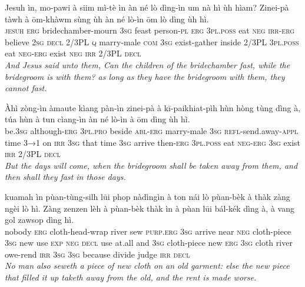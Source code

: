 \documentclass[11pt,a4paper]{article}
\begin{document}
\begin{exe}
\gll Jesuh ìn, mo-pawi à siim mì-tè ìn àn né lò dìng-ìn um nà hì ùh hìam? Zinei-pà tàwh à ōm-khàwm sùng ùh àn né lò-ìn ōm lò dìng ùh hì. \\
     \textsc{jesuh} \textsc{erg} bridechamber-mourn \textsc{3sg} feast person-\textsc{pl} \textsc{erg} \textsc{3pl}.\textsc{poss} eat \textsc{neg} \textsc{irr}-\textsc{erg} believe \textsc{2sg} \textsc{decl} 2/3PL \textsc{q} marry-male \textsc{com} \textsc{3sg} exist-gather inside 2/3PL \textsc{3pl}.\textsc{poss} eat \textsc{neg}-\textsc{erg} exist \textsc{neg} \textsc{irr} 2/3PL \textsc{decl} \\
\glt \textcolor{kjvcolor}{\textit{And Jesus said unto them, Can the children of the bridechamber fast, while the bridegroom is with them? as long as they have the bridegroom with them, they cannot fast.}}

\gll Àhì zòng-ìn àmaute kìang pàn-ìn zinei-pà à kī-paikhiat-pìh hùn hòng tùng dìng à, túa hùn à tun cìang-ìn àn né lò-ìn à ōm dìng ùh hì. \\
     be.\textsc{3sg} although-\textsc{erg} \textsc{3pl}.\textsc{pro} beside \textsc{abl}-\textsc{erg} marry-male \textsc{3sg} \textsc{refl}-send.away-\textsc{appl} time \textsc{3→1} on \textsc{irr} \textsc{3sg} that time \textsc{3sg} arrive then-\textsc{erg} \textsc{3pl}.\textsc{poss} eat \textsc{neg}-\textsc{erg} \textsc{3sg} exist \textsc{irr} 2/3PL \textsc{decl} \\
\glt \textcolor{kjvcolor}{\textit{But the days will come, when the bridegroom shall be taken away from them, and then shall they fast in those days.}}

\gll kuamah ìn pùan-tùng-silh lūi phop nàdìngìn à ton nái lò pùan-bèk à thàk zàng ngèi lò hì. Zàng zenzen lèh à pùan-bèk thàk ìn à pùan lūi bál-kék dìng à, à vang gol zawsop dìng hì. \\
     nobody \textsc{erg} cloth-head-wrap river sew \textsc{purp}.\textsc{erg} \textsc{3sg} arrive near \textsc{neg} cloth-piece \textsc{3sg} new use \textsc{exp} \textsc{neg} \textsc{decl} use at.all and \textsc{3sg} cloth-piece new \textsc{erg} \textsc{3sg} cloth river owe-rend \textsc{irr} \textsc{3sg} \textsc{3sg} because divide judge \textsc{irr} \textsc{decl} \\
\glt \textcolor{kjvcolor}{\textit{No man also seweth a piece of new cloth on an old garment: else the new piece that filled it up taketh away from the old, and the rent is made worse.}}


\end{exe}
\end{document}
